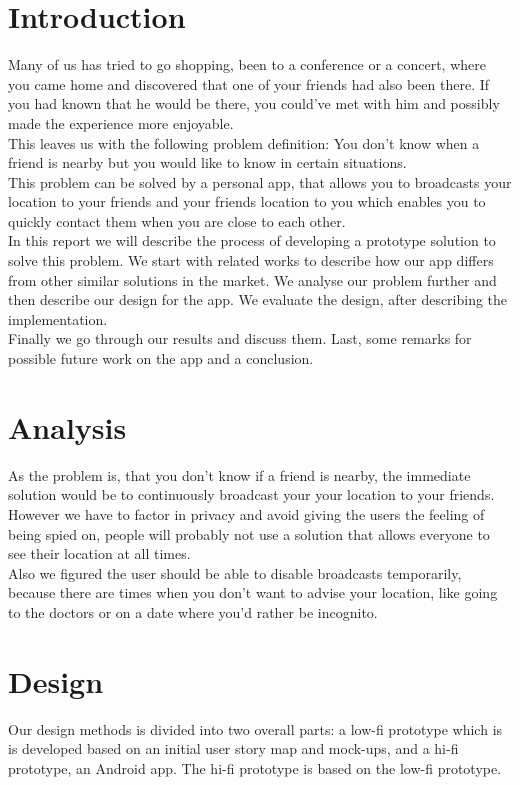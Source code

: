 \documentclass[runningheads,a4paper]{llncs}
\begin{document}
\section{Introduction}
Many of us has tried to go shopping, been to a conference or a concert, where you came home and discovered that one of your friends had also been there. If you had known that he would be there, you could’ve met with him and possibly made the experience more enjoyable.\\

This leaves us with the following problem definition: You don’t know when a friend is nearby but you would like to know in certain situations. \\

This problem can be solved by a personal app, that allows you to  broadcasts your location to your friends and your friends location to you which enables you to quickly contact them when you are close to each other.\\

In this report we will describe the process of developing a prototype solution to solve this problem.
We start with related works to describe how our app differs from other similar solutions in the market. 
We analyse our problem further and then describe our design for the app. We evaluate the design, after describing the implementation. \\
Finally we go through our results and discuss them. Last, some remarks for possible future work on the app and a conclusion. 



\section{Analysis}
As the problem is, that you don’t know if a friend is nearby, the immediate solution would be to continuously broadcast your your location to your friends.
However we have to factor in privacy and avoid giving the users the feeling of being spied on, people will probably not use a solution that allows everyone to see their location at all times.\\
Also we figured the user should be able to disable broadcasts temporarily, because there are times when you don't want to advise your location, like going to the doctors or on a date where you’d rather be incognito. 


\section{Design}
Our design methods is divided into two overall parts: a low-fi prototype which is is developed based on an initial user story map and mock-ups, and a hi-fi prototype, an Android app. The hi-fi prototype is based on the low-fi prototype. \\
\end{document}
